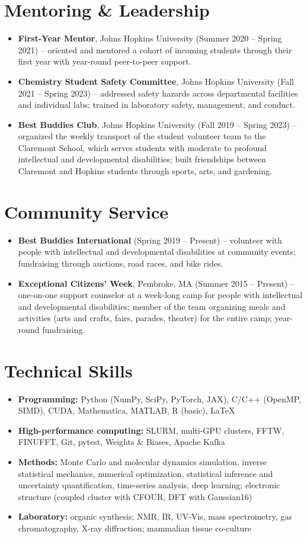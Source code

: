 \documentclass[letterpaper,10pt]{article}
\newcommand{\resumeLineListStart}{\begin{itemize}[leftmargin=0.15in, label={}, itemsep=1pt, topsep=2pt]\small}
\newcommand{\resumeLineListEnd}{\end{itemize}}
\begin{document}
\section{Mentoring \& Leadership}
\resumeLineListStart
    \item \textbf{First-Year Mentor}, Johns Hopkins University (Summer 2020 -- Spring 2021) -- oriented and mentored a cohort of incoming students through their first year with year-round peer-to-peer support.
    \item \textbf{Chemistry Student Safety Committee}, Johns Hopkins University (Fall 2021 -- Spring 2023) -- addressed safety hazards across departmental facilities and individual labs; trained in laboratory safety, management, and conduct.
    \item \textbf{Best Buddies Club}, Johns Hopkins University (Fall 2019 -- Spring 2023) -- organized the weekly transport of the student volunteer team to the Claremont School, which serves students with moderate to profound intellectual and developmental disabilities; built friendships between Claremont and Hopkins students through sports, arts, and gardening.
\resumeLineListEnd

\section{Community Service}
\resumeLineListStart
    \item \textbf{Best Buddies International} (Spring 2019 -- Present) -- volunteer with people with intellectual and developmental disabilities at community events; fundraising through auctions, road races, and bike rides.
    \item \textbf{Exceptional Citizens' Week}, Pembroke, MA (Summer 2015 -- Present) -- one-on-one support counselor at a week-long camp for people with intellectual and developmental disabilities; member of the team organizing meals and activities (arts and crafts, fairs, parades, theater) for the entire camp; year-round fundraising.
\resumeLineListEnd

\section{Technical Skills}
\resumeLineListStart
    \item \textbf{Programming:} Python (NumPy, SciPy, PyTorch, JAX), C/C++ (OpenMP, SIMD), CUDA, Mathematica, MATLAB, R (basic), LaTeX
    \item \textbf{High-performance computing:} SLURM, multi-GPU clusters, FFTW, FINUFFT, Git, pytest, Weights \& Biases, Apache Kafka
    \item \textbf{Methods:} Monte Carlo and molecular dynamics simulation, inverse statistical mechanics, numerical optimization, statistical inference and uncertainty quantification, time-series analysis, deep learning; electronic structure (coupled cluster with CFOUR, DFT with Gaussian16)
    \item \textbf{Laboratory:} organic synthesis; NMR, IR, UV-Vis, mass spectrometry, gas chromatography, X-ray diffraction; mammalian tissue co-culture
\resumeLineListEnd
\end{document}
